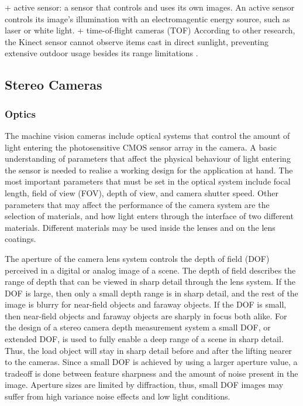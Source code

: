 \documentclass[12pt,a4paper,oneside,pdftex]{report}
\begin{document}
+ active sensor: a sensor that controls and uses its own images. An active sensor controls its image's illumination with an electromagentic energy source, such as laser or white light.
+ time-of-flight cameras (TOF)
According to other research, the Kinect sensor cannot observe items cast in direct sunlight, preventing extensive outdoor usage besides its range limitations \cite{tikkanen13}.  

\subsection{Stereo Cameras}
\label{subsection:stereo_cameras}

\subsubsection{Optics}
\label{subsubsection:optics_and_photometrics}


The machine vision cameras include optical systems that control the amount of light entering the photosensitive CMOS sensor array in the camera. A basic understanding of parameters that affect the physical behaviour of light entering the sensor is needed to realise a working design for the application at hand. The most important parameters that must be set in the optical system include focal length, field of view (FOV), depth of view, and camera shutter speed. Other parameters that may affect the performance of the camera system are the selection of materials, and how light enters through the interface of two different materials. Different materials may be used inside the lenses and on the lens coatings. 

The aperture of the camera lens system controls the depth of field (DOF) perceived in a digital or analog image of a scene. The depth of field describes the range of depth that can be viewed in sharp detail through the lens system. If the DOF is large, then only a small depth range is in sharp detail, and the rest of the image is blurry for near-field objects and faraway objects. If the DOF is small, then near-field objects and faraway objects are sharply in focus both alike. For the design of a stereo camera depth measurement system a small DOF, or extended DOF, is used to fully enable a deep range of a scene in sharp detail. Thus, the load object will stay in sharp detail before and after the lifting nearer to the cameras. Since a small DOF is achieved by using a larger aperture value, a tradeoff is done between feature sharpness and the amount of noise present in the image. Aperture sizes are limited by diffraction, thus, small DOF images may suffer from high variance noise effects and low light conditions.
\end{document}
